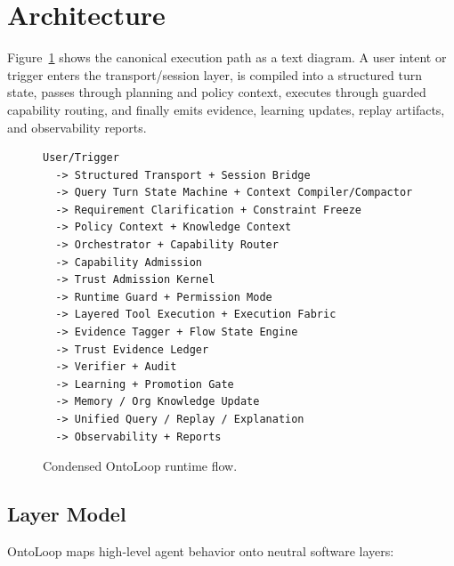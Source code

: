 \documentclass[11pt]{article}
\begin{document}
\section{Architecture}

Figure~\ref{fig:flow} shows the canonical execution path as a text diagram. A user
intent or trigger enters the transport/session layer, is compiled into a structured
turn state, passes through planning and policy context, executes through guarded
capability routing, and finally emits evidence, learning updates, replay artifacts,
and observability reports.

\begin{figure}[h]
\centering
\begin{minipage}{0.95\linewidth}
\begin{verbatim}
User/Trigger
  -> Structured Transport + Session Bridge
  -> Query Turn State Machine + Context Compiler/Compactor
  -> Requirement Clarification + Constraint Freeze
  -> Policy Context + Knowledge Context
  -> Orchestrator + Capability Router
  -> Capability Admission
  -> Trust Admission Kernel
  -> Runtime Guard + Permission Mode
  -> Layered Tool Execution + Execution Fabric
  -> Evidence Tagger + Flow State Engine
  -> Trust Evidence Ledger
  -> Verifier + Audit
  -> Learning + Promotion Gate
  -> Memory / Org Knowledge Update
  -> Unified Query / Replay / Explanation
  -> Observability + Reports
\end{verbatim}
\end{minipage}
\caption{Condensed OntoLoop runtime flow.}
\label{fig:flow}
\end{figure}

\subsection{Layer Model}

OntoLoop maps high-level agent behavior onto neutral software layers:
\end{document}
